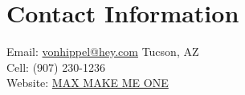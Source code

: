 \section{\mysidestyle Contact Information}
Email: \href{mailto:vonhippel@hey.com}{vonhippel@hey.com}
\hfill Tucson, AZ\\
\hfill Cell: (907) 230-1236\\
Website: \href{https://mxvh.pl}{MAX MAKE ME ONE}